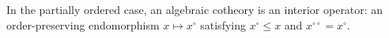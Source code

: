 In the partially ordered case, an algebraic cotheory is an interior operator: an order-preserving endomorphism $x \mapsto x^{\circ}$ satisfying $x^{\circ} \leqslant x$ and $x^{\circ\circ} = x^{\circ}$.
